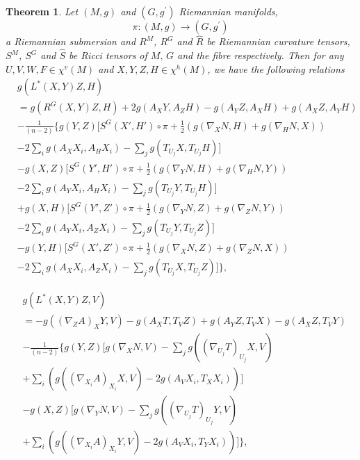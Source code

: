 \documentclass{birkjour}
\newtheorem{theorem}{Theorem}[section]
\theoremstyle{definition}
\theoremstyle{remark}
\numberwithin{equation}{section}
\begin{document}
\begin{theorem}
	Let $(M, g)$ and $(G, g^\prime)$ Riemannian manifolds,
	$$\pi: (M, g) \to(G, g^\prime)$$
	a Riemannian submersion and $R^M$, $R^G$ and $\hat{R}$ be Riemannian curvature tensors, $S^M$, $S^G$ and $\hat{S}$ be Ricci tensors of $M, \, G$ and the fibre respectively. Then for any $U, V, W, F \in \chi^v (M)$ and $X, Y, Z, H\in  \chi^h (M)$, we have the following relations
	\begin{align*}
		&g(L^* (X,Y)Z, H)\\
		&= g(R^G (X,Y)Z, H) +2 g (A_X Y, A_Z H) - g(A_Y Z, A_X H) + g(A_X Z, A_Y H) \\
		&- \frac{1}{(n-2)} \Bigg\{g(Y,Z) \bigg[S^G (X',H') \circ \pi + \frac{1}{2} \left(g(\nabla_X N,H)+ g(\nabla_H N, X)\right)  \\
		&-2 \sum_{i} g(A_X X_i, A_H X_i)- \sum_{j}g(T_{U_j}X, T_{U_j}H)  \bigg] \\
		&-g(X,Z) \bigg[S^G (Y',H') \circ \pi + \frac{1}{2} \left(g(\nabla_Y N,H)+ g(\nabla_H N, Y)\right) \\
		&-2 \sum_{i} g(A_Y X_i, A_H X_i)- \sum_{j}g(T_{U_j}Y, T_{U_j}H)  \bigg] \\
		&+g(X, H) \bigg[S^G (Y',Z') \circ \pi
		+\frac{1}{2} \left(g(\nabla_Y N,Z)+g(\nabla_Z N, Y)\right) \\
		&- 2 \sum_{i} g(A_Y X_i, A_Z X_i) - \sum_{j} g(T_{U_j}Y, T_{U_j}Z) \Bigg] \\
		&-g(Y,H) \bigg[S^G (X',Z') \circ \pi + \frac{1}{2} \left(g(\nabla_X N,Z)+ g(\nabla_Z N, X)\right) \\
		&-2 \sum_{i} g(A_X X_i, A_Z X_i)- \sum_{j}g(T_{U_j}X, T_{U_j}Z)  \bigg] \Bigg\},
	\end{align*}
	
	\begin{align*}
		&g(L^* (X,Y)Z, V) \\
		&=-g((\nabla_Z A)_X Y,V) - g(A_X T, T_V Z) + g(A_Y Z, T_V X)- g(A_X Z, T_V Y) \\
		&- \frac{1}{(n-2)} \Bigg\{g(Y, Z) \bigg[g(\nabla_X N,V)
		-\sum_{j} g((\nabla_{U_j} T)_{U_j} X, V) \\
		&+\sum_{i}\left(g((\nabla_{X_i}A)_{X_i} X,V )- 2 g (A_V X_i, T_X X_i) \right) \bigg] \\
		&  -g(X,Z) \bigg[g(\nabla_Y N,V)
		-\sum_{j} g((\nabla_{U_j} T)_{U_j} Y, V) \\
		&+ \sum_{i}\left(g((\nabla_{X_i}A)_{X_i} Y,V  ) - 2 g (A_V X_i, T_Y X_i) \right) \bigg] \Bigg\},
	\end{align*}
	

\end{theorem}
\end{document}
